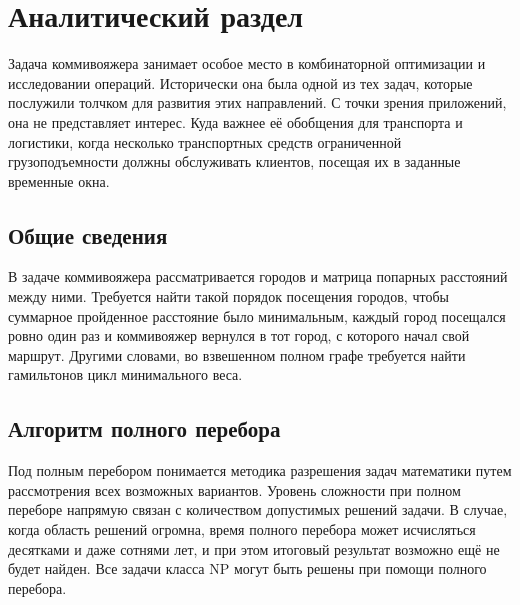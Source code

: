 \documentclass[14pt, a4paper]{extarticle}
\begin{document}
\clearpage
\section{Аналитический раздел}
Задача коммивояжера занимает особое место в комбинаторной оптимизации и исследовании операций. Исторически она была одной из тех задач, которые послужили толчком для развития этих направлений. С точки зрения приложений, она не представляет интерес. Куда важнее её обобщения для транспорта и логистики, когда несколько транспортных средств ограниченной грузоподъемности должны обслуживать клиентов, посещая их в заданные временные окна. 
\subsection{Общие сведения}
В задаче коммивояжера рассматривается городов и матрица попарных расстояний между ними. Требуется найти такой порядок посещения городов, чтобы суммарное пройденное расстояние было минимальным, каждый город посещался ровно один раз и коммивояжер вернулся в тот город, с которого начал свой маршрут. Другими словами, во взвешенном полном графе требуется найти гамильтонов цикл минимального веса.\par
\subsection{Алгоритм полного перебора}
Под полным перебором понимается методика разрешения задач математики путем рассмотрения всех возможных вариантов. Уровень сложности при полном переборе напрямую связан с количеством допустимых решений задачи. В случае, когда область решений огромна, время полного перебора может исчисляться десятками и даже сотнями лет, и при этом итоговый результат возможно ещё не будет найден. Все задачи класса NP могут быть решены при помощи полного перебора.
\end{document}
